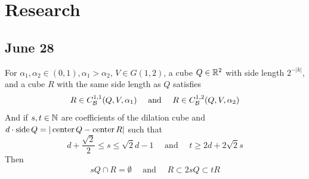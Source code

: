 \section{Research}

\subsection{June 28}
\begin{lemma}
    For $\alpha_1, \alpha_2\in(0,1), \alpha_1>\alpha_2$, $V\in G(1,2)$, a cube $Q\in \mathbb{R}^2$ with side length $2^{-|k|}$, and a cube $R$ with the same side length as $Q$ satisfies
    \begin{equation}\label{eq:condition-GDBC-2}
        R\in C_\mathcal B^{1,1}(Q, V, \alpha_1) \quad\text{ and }\quad R\in  C_\mathcal B^{1,2}(Q, V, \alpha_2)
    \end{equation}
    And if $s, t\in \mathbb{N}$ are coefficients of the dilation cube and $d\cdot\operatorname{side} Q=|\operatorname{center} Q-\operatorname{center} R|$ such that 
    \begin{equation}\label{eq:tRcover2sQ-cond}
        d+\frac{\sqrt{2}}{2}\leq s \leq \sqrt{2}d-1 \quad\text{ and }\quad t \geq 2d + 2\sqrt{2}s
    \end{equation} 
    Then 
    \begin{equation}\label{eq:tRcover2sQ-conclusion}
        sQ\cap R = \emptyset \quad\text{ and }\quad R\subset 2sQ\subset tR
    \end{equation}
\end{lemma}
